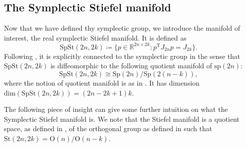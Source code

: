 \subsection{The Symplectic Stiefel manifold}
Now that we have defined thy symplectic group, we introduce the manifold of interest, the real symplectic Stiefel manifold. It is defined as
\begin{equation*}
    \mathrm{SpSt}(2n, 2k)\coloneqq \{p\in \mathbb{R}^{2n\times2k}:p ^{\mathrm{T}}J_{2n}p=J_{2k}\}.
\end{equation*}
Following \cite[Prop.~3.1]{BendokatZimmermann2021}, it is explicitly connected to the symplectic group in the sense that $\mathrm{SpSt}(2n, 2k)$ is diffeomorphic to the following quotient manifold of $\mathrm{sp}(2n)$:
\begin{equation*}
    \mathrm{SpSt}(2n, 2k)\cong \mathrm{Sp}(2n)/\mathrm{Sp}(2(n-k)),
\end{equation*}
where the notion of quotient manifold is as in . It has dimension $\mathrm{dim}(\mathrm{SpSt}(2n, 2k))=(2n-2k+1)k$. 

The following piece of insight can give some further intuition on what the Symplectic Stiefel manifold is. We note that the Stiefel manifold is a quotient space, as defined in , of the orthogonal group as defined in  such that $\mathrm{St}(2n, 2k)=\mathrm{O}(n)/\mathrm{O}(n-k)$. 

